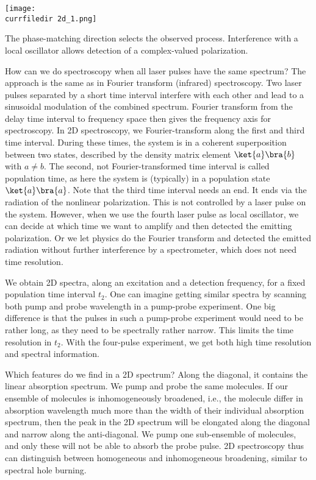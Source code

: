\begin{marginfigure}
\texttt{[image: \\currfiledir 2d\_1.png]}
\caption{The phase-matching direction selects the observed process. Interference with a local oscillator allows detection of a complex-valued polarization.}
\label{fig_2d_setup}
\end{marginfigure}


How can we do spectroscopy when all laser pulses have the same spectrum? The approach is the same as in Fourier transform (infrared) spectroscopy. Two laser pulses separated by a short time interval interfere with each other and lead to a sinusoidal modulation of the combined spectrum. Fourier transform from the delay time interval to frequency space then gives the frequency axis for spectroscopy. In 2D spectroscopy, we Fourier-transform along the first and third time interval. During these times, the system is in a coherent superposition between two states, described by the density matrix element $\ket{a}\bra{b}$ with $a \neq b$. The second, not Fourier-transformed time interval is called population time, as here the system is (typically) in a population state $\ket{a}\bra{a}$. Note that the third time interval needs an end. It ends via the radiation of the nonlinear polarization. This is not controlled by a laser pulse on the system. However, when we use the fourth laser pulse as local oscillator, we can decide at which  time we want to amplify and then detected the emitting polarization. Or we let physics do the Fourier transform and detected the emitted radiation without further interference by a spectrometer, which does not need time resolution.

We obtain 2D spectra, along an excitation and a detection frequency, for a fixed population time interval $t_2$. One can imagine getting similar spectra by scanning both pump and probe wavelength in a pump-probe experiment. One big difference is that the pulses in such a pump-probe experiment would need to be rather long, as they need to be spectrally rather narrow. This limits the time resolution in $t_2$. With the four-pulse experiment, we get both high time resolution and spectral information.

Which features do we find in a 2D spectrum? Along the diagonal, it contains the linear absorption spectrum. We pump and probe the same molecules. If our ensemble of molecules is inhomogeneously broadened, i.e., the molecule differ in absorption wavelength much more than the width of their individual absorption spectrum, then the peak in the 2D spectrum will be elongated along the diagonal and narrow along the anti-diagonal. We pump one sub-ensemble of molecules, and only these will not be able to absorb the probe pulse. 2D spectroscopy thus can distinguish between homogeneous and inhomogeneous broadening, similar to spectral hole burning.



